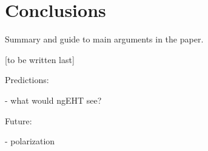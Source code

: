 \section{Conclusions}\label{sec:conclusions}

Summary and guide to main arguments in the paper.

[to be written last]

Predictions:

- what would ngEHT see?

Future:

- polarization


